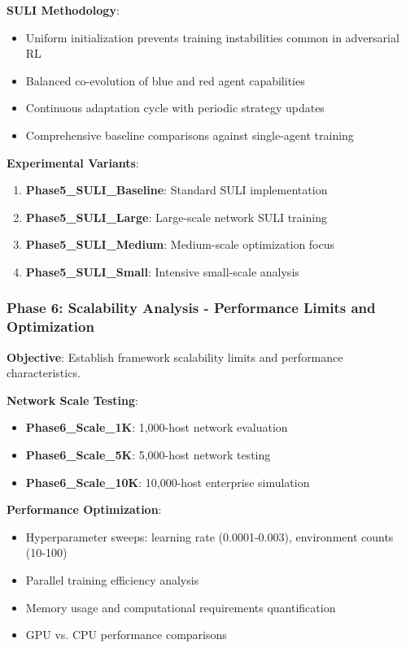 \documentclass[11pt]{article}
\theoremstyle{definition}
\theoremstyle{plain}
\begin{document}
\textbf{SULI Methodology}:
\begin{itemize}
\item Uniform initialization prevents training instabilities common in adversarial RL
\item Balanced co-evolution of blue and red agent capabilities
\item Continuous adaptation cycle with periodic strategy updates
\item Comprehensive baseline comparisons against single-agent training
\end{itemize}

\textbf{Experimental Variants}:
\begin{enumerate}
\item \textbf{Phase5\_SULI\_Baseline}: Standard SULI implementation
\item \textbf{Phase5\_SULI\_Large}: Large-scale network SULI training
\item \textbf{Phase5\_SULI\_Medium}: Medium-scale optimization focus
\item \textbf{Phase5\_SULI\_Small}: Intensive small-scale analysis
\end{enumerate}

\subsubsection{Phase 6: Scalability Analysis - Performance Limits and Optimization}
\textbf{Objective}: Establish framework scalability limits and performance characteristics.

\textbf{Network Scale Testing}:
\begin{itemize}
\item \textbf{Phase6\_Scale\_1K}: 1,000-host network evaluation
\item \textbf{Phase6\_Scale\_5K}: 5,000-host network testing
\item \textbf{Phase6\_Scale\_10K}: 10,000-host enterprise simulation
\end{itemize}

\textbf{Performance Optimization}:
\begin{itemize}
\item Hyperparameter sweeps: learning rate (0.0001-0.003), environment counts (10-100)
\item Parallel training efficiency analysis
\item Memory usage and computational requirements quantification
\item GPU vs. CPU performance comparisons
\end{itemize}
\end{document}
